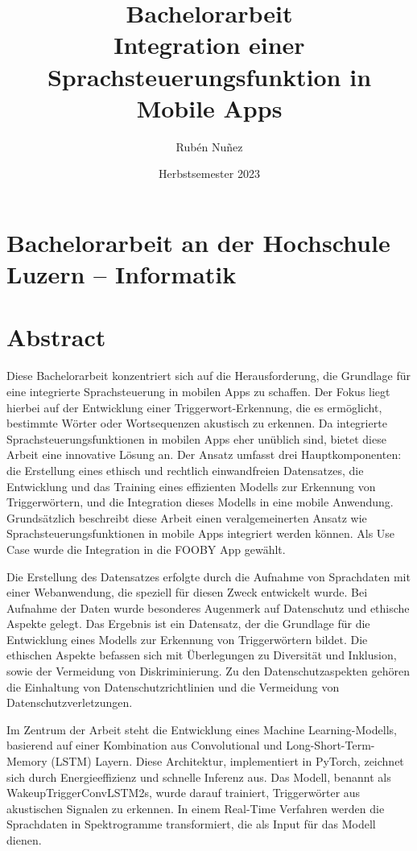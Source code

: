 \documentclass[11pt,a4paper]{article}
\title{
	{\LARGE Bachelorarbeit}\\[2em] 
	{\textbf{Integration einer Sprachsteuerungsfunktion {\break} in Mobile Apps}}
}
\author{Rubén Nuñez}
\date{Herbstsemester 2023}
\begin{document}
\maketitle
\thispagestyle{empty} %
\newpage

\section*{Bachelorarbeit an der Hochschule Luzern -- Informatik}

\newpage

\newpage \section*{Abstract}
Diese Bachelorarbeit konzentriert sich auf die Herausforderung, die Grundlage für eine integrierte 
Sprachsteuerung in mobilen Apps zu schaffen. Der Fokus liegt hierbei auf der Entwicklung einer 
Triggerwort-Erkennung, die es ermöglicht, bestimmte Wörter oder Wortsequenzen akustisch zu erkennen. 
Da integrierte Sprachsteuerungsfunktionen in mobilen Apps eher unüblich sind, 
bietet diese Arbeit eine innovative Lösung an. Der Ansatz umfasst drei Hauptkomponenten: die 
Erstellung eines ethisch und rechtlich einwandfreien Datensatzes, die Entwicklung und das Training 
eines effizienten Modells zur Erkennung von Triggerwörtern, und die Integration dieses Modells in 
eine mobile Anwendung. Grundsätzlich beschreibt diese Arbeit einen veralgemeinerten Ansatz wie 
Sprachsteuerungsfunktionen in mobile Apps integriert werden können. Als 
Use Case wurde die Integration in die FOOBY App gewählt.


\noindent \newline
Die Erstellung des Datensatzes erfolgte durch die Aufnahme von Sprachdaten mit einer Webanwendung, 
die speziell für diesen Zweck entwickelt wurde. Bei Aufnahme der Daten wurde besonderes Augenmerk 
auf Datenschutz und ethische Aspekte gelegt. Das Ergebnis ist ein Datensatz, der die Grundlage für 
die Entwicklung eines Modells zur Erkennung von Triggerwörtern bildet. Die ethischen Aspekte 
befassen sich mit Überlegungen zu Diversität und Inklusion, sowie der Vermeidung von Diskriminierung. 
Zu den Datenschutzaspekten gehören die Einhaltung von Datenschutzrichtlinien und die Vermeidung 
von Datenschutzverletzungen.


\noindent \newline
Im Zentrum der Arbeit steht die Entwicklung eines Machine Learning-Modells, basierend auf einer 
Kombination aus Convolutional und Long-Short-Term-Memory (LSTM) Layern. Diese Architektur, 
implementiert in PyTorch, zeichnet sich durch Energieeffizienz und schnelle Inferenz aus. Das 
Modell, benannt als WakeupTriggerConvLSTM2s, wurde darauf trainiert, Triggerwörter aus 
akustischen Signalen zu erkennen. In einem Real-Time Verfahren werden die Sprachdaten in 
Spektrogramme transformiert, die als Input für das Modell dienen. 
\end{document}
